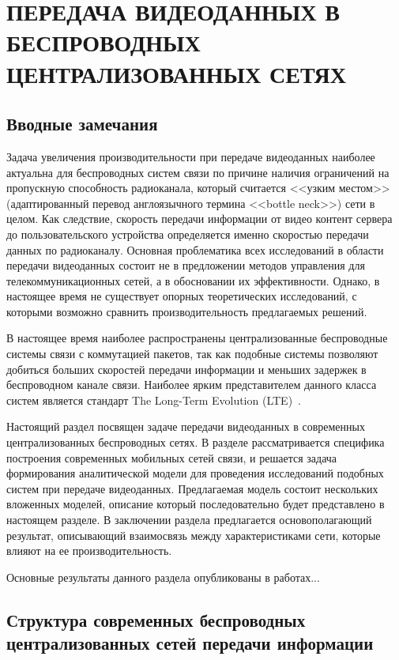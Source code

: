 \chapter{ПЕРЕДАЧА ВИДЕОДАННЫХ В БЕСПРОВОДНЫХ ЦЕНТРАЛИЗОВАННЫХ СЕТЯХ}
\label{chap2}

\section{Вводные замечания}
\label{chap2:Intro}

Задача увеличения производительности при передаче видеоданных наиболее актуальна для беспроводных систем связи по причине наличия ограничений на пропускную способность радиоканала, который считается <<узким местом>> (адаптированный перевод англоязычного термина <<bottle neck>>) сети в целом. Как следствие, скорость передачи информации от видео контент сервера до пользовательского устройства определяется именно скоростью передачи данных по радиоканалу. Основная проблематика всех исследований в области передачи видеоданных состоит не в предложении методов управления для телекоммуникационных сетей, а в обосновании их эффективности. Однако, в настоящее время не существует опорных теоретических исследований, с которыми возможно сравнить производительность предлагаемых решений.

В настоящее время наиболее распространены централизованные беспроводные системы связи с коммутацией пакетов, так как подобные системы позволяют добиться больших скоростей передачи информации и меньших задержек в беспроводном канале связи. Наиболее ярким представителем данного класса систем является стандарт The Long-Term Evolution (LTE)~\cite{opac-b1130916}.

Настоящий раздел посвящен задаче передачи видеоданных в современных централизованных беспроводных сетях. В разделе рассматривается специфика построения современных мобильных сетей связи, и решается задача формирования аналитической модели для проведения исследований подобных систем при передаче видеоданных. Предлагаемая модель состоит нескольких вложенных моделей, описание который последовательно будет представлено в настоящем разделе. В заключении раздела предлагается основополагающий результат, описывающий взаимосвязь между характеристиками сети, которые влияют на ее производительность.

Основные результаты данного раздела опубликованы в работах...

\section{Структура современных беспроводных централизованных сетей передачи информации}
\label{chap2:WirelessSystemStructure}

